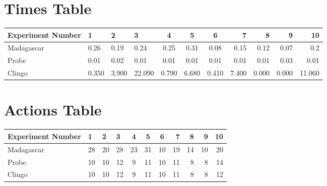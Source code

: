 \documentclass[8pt]{article}
\begin{document}
\begin{landscape}
\section{Times Table}\begin{tabular}{ | l | l | l | l | c | c | c | r | r | r | r | }\hline
Experiment Number & 1 & 2 & 3 & 4 & 5 & 6 & 7 & 8 & 9 & 10\\  \hline
Madagascar & 0.26 & 0.19 & 0.24 & 0.25 & 0.31 & 0.08 & 0.15 & 0.12 & 0.07 & 0.2\\  \hline
Probe & 0.01 & 0.02 & 0.01 & 0.01 & 0.01 & 0.01 & 0.01 & 0.01 & 0.03 & 0.01\\  \hline
Clingo & 0.350 & 3.900 & 22.090 & 0.790 & 6.680 & 0.410 & 7.400 & 0.000 & 0.000 & 11.060\\  \hline
\end{tabular}
\section{Actions Table}\begin{tabular}{ | l | l | l | l | c | c | c | r | r | r | r | }\hline
Experiment Number & 1 & 2 & 3 & 4 & 5 & 6 & 7 & 8 & 9 & 10\\ \hline
 Madagascar & 28 & 20 & 28 & 23 & 31 & 10 & 19 & 14 & 10 & 20\\ \hline
 Probe & 10 & 10 & 12 & 9 & 11 & 10 & 11 & 8 & 8 & 14\\ \hline
 Clingo & 10 & 10 & 12 & 9 & 11 & 10 & 11 & 8 & 8 & 12\\ \hline
\end{tabular}
\end{landscape}
\end{document}
